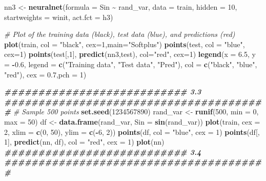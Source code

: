 \documentclass[
]{article}
\newenvironment{Shaded}{\begin{snugshade}}{\end{snugshade}}
\newcommand{\AttributeTok}[1]{\textcolor[rgb]{0.13,0.29,0.53}{#1}}
\newcommand{\CommentTok}[1]{\textcolor[rgb]{0.56,0.35,0.01}{\textit{#1}}}
\newcommand{\DecValTok}[1]{\textcolor[rgb]{0.00,0.00,0.81}{#1}}
\newcommand{\DocumentationTok}[1]{\textcolor[rgb]{0.56,0.35,0.01}{\textbf{\textit{#1}}}}
\newcommand{\FloatTok}[1]{\textcolor[rgb]{0.00,0.00,0.81}{#1}}
\newcommand{\FunctionTok}[1]{\textcolor[rgb]{0.13,0.29,0.53}{\textbf{#1}}}
\newcommand{\NormalTok}[1]{#1}
\newcommand{\OtherTok}[1]{\textcolor[rgb]{0.56,0.35,0.01}{#1}}
\newcommand{\SpecialCharTok}[1]{\textcolor[rgb]{0.81,0.36,0.00}{\textbf{#1}}}
\newcommand{\StringTok}[1]{\textcolor[rgb]{0.31,0.60,0.02}{#1}}
\begin{document}
\begin{Shaded}
\begin{Highlighting}[]
\NormalTok{nn3 }\OtherTok{\textless{}{-}} \FunctionTok{neuralnet}\NormalTok{(}\AttributeTok{formula =}\NormalTok{ Sin }\SpecialCharTok{\textasciitilde{}}\NormalTok{ rand\_var, }\AttributeTok{data =}\NormalTok{ train, }\AttributeTok{hidden =} \DecValTok{10}\NormalTok{,}
\AttributeTok{startweights =}\NormalTok{ winit, }\AttributeTok{act.fct =}\NormalTok{ h3)}

\CommentTok{\# Plot of the training data (black), test data (blue), and predictions (red)}
\FunctionTok{plot}\NormalTok{(train,  }\AttributeTok{col =} \StringTok{"black"}\NormalTok{, }\AttributeTok{cex=}\DecValTok{1}\NormalTok{,}\AttributeTok{main=}\StringTok{"Softplus"}\NormalTok{)}
\FunctionTok{points}\NormalTok{(test, }\AttributeTok{col =} \StringTok{"blue"}\NormalTok{, }\AttributeTok{cex=}\DecValTok{1}\NormalTok{)}
\FunctionTok{points}\NormalTok{(test[,}\DecValTok{1}\NormalTok{], }\FunctionTok{predict}\NormalTok{(nn3,test), }\AttributeTok{col=}\StringTok{"red"}\NormalTok{, }\AttributeTok{cex=}\DecValTok{1}\NormalTok{)}
\FunctionTok{legend}\NormalTok{(}\AttributeTok{x =} \FloatTok{6.5}\NormalTok{, }\AttributeTok{y =} \SpecialCharTok{{-}}\FloatTok{0.6}\NormalTok{, }\AttributeTok{legend =} \FunctionTok{c}\NormalTok{(}\StringTok{"Training data"}\NormalTok{, }\StringTok{"Test data"}\NormalTok{,}
\StringTok{"Pred"}\NormalTok{), }\AttributeTok{col =} \FunctionTok{c}\NormalTok{(}\StringTok{"black"}\NormalTok{, }\StringTok{"blue"}\NormalTok{, }\StringTok{"red"}\NormalTok{), }\AttributeTok{cex =} \FloatTok{0.7}\NormalTok{,}\AttributeTok{pch =} \DecValTok{1}\NormalTok{)}

\DocumentationTok{\#\#\#\#\#\#\#\#\#\#\#\#\#\#\#\#\#\#\#\#\#\#\#\#\#\#\#  3.3  \#\#\#\#\#\#\#\#\#\#\#\#\#\#\#\#\#\#\#\#\#\#\#\#\#\#\#\#\#\#\#\#\#\#\#\#\#\#\#}
\CommentTok{\# Sample 500 points}
\FunctionTok{set.seed}\NormalTok{(}\DecValTok{1234567890}\NormalTok{)}
\NormalTok{rand\_var }\OtherTok{\textless{}{-}} \FunctionTok{runif}\NormalTok{(}\DecValTok{500}\NormalTok{, }\AttributeTok{min =} \DecValTok{0}\NormalTok{, }\AttributeTok{max =} \DecValTok{50}\NormalTok{) }
\NormalTok{df }\OtherTok{\textless{}{-}} \FunctionTok{data.frame}\NormalTok{(rand\_var, }\AttributeTok{Sin =} \FunctionTok{sin}\NormalTok{(rand\_var))}
\FunctionTok{plot}\NormalTok{(train, }\AttributeTok{cex =} \DecValTok{2}\NormalTok{, }\AttributeTok{xlim =} \FunctionTok{c}\NormalTok{(}\DecValTok{0}\NormalTok{, }\DecValTok{50}\NormalTok{), }\AttributeTok{ylim =} \FunctionTok{c}\NormalTok{(}\SpecialCharTok{{-}}\DecValTok{6}\NormalTok{, }\DecValTok{2}\NormalTok{))}
\FunctionTok{points}\NormalTok{(df, }\AttributeTok{col =} \StringTok{"blue"}\NormalTok{, }\AttributeTok{cex =} \DecValTok{1}\NormalTok{)}
\FunctionTok{points}\NormalTok{(df[, }\DecValTok{1}\NormalTok{], }\FunctionTok{predict}\NormalTok{(nn, df), }\AttributeTok{col =} \StringTok{"red"}\NormalTok{, }\AttributeTok{cex =} \DecValTok{1}\NormalTok{)}
\FunctionTok{plot}\NormalTok{(nn)}
\DocumentationTok{\#\#\#\#\#\#\#\#\#\#\#\#\#\#\#\#\#\#\#\#\#\#\#\#\#\#\#  3.4  \#\#\#\#\#\#\#\#\#\#\#\#\#\#\#\#\#\#\#\#\#\#\#\#\#\#\#\#\#\#\#\#\#\#\#\#\#\#\#}


\end{Highlighting}
\end{Shaded}
\end{document}
